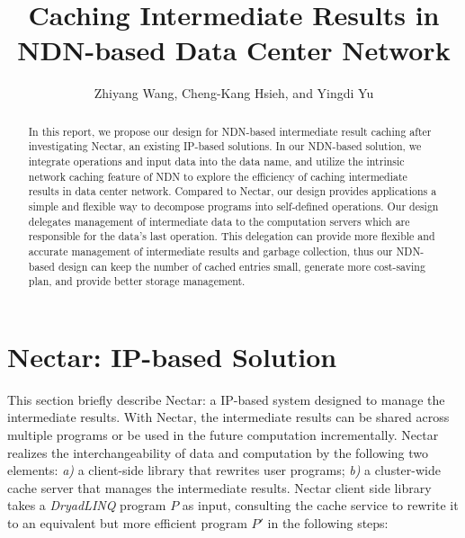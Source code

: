 \documentclass[journal]{IEEEtran}
\begin{document}
\title{Caching Intermediate Results in NDN-based Data Center Network}

\author{Zhiyang Wang,
  Cheng-Kang Hsieh,
  and Yingdi Yu}

\maketitle

\begin{abstract}
In this report, we propose our design for NDN-based intermediate result caching
after investigating Nectar, an existing IP-based solutions.  In our NDN-based
solution, we integrate operations and input data into the data name, and utilize
the intrinsic network caching feature of NDN to explore the efficiency of
caching intermediate results in data center network.  Compared to Nectar, our
design provides applications a simple and flexible way to decompose programs
into self-defined operations.  Our design delegates management of intermediate
data to the computation servers which are responsible for the data's last
operation.  This delegation can provide more flexible and accurate management of
intermediate results and garbage collection, thus our NDN-based design can keep
the number of cached entries small, generate more cost-saving plan, and provide
better storage management.
\end{abstract}

\section{Nectar: IP-based Solution}
This section
briefly describe Nectar: a IP-based system designed to manage the intermediate
results. With Nectar, the intermediate results can be shared across multiple
programs or be used in the future computation incrementally.  Nectar realizes
the interchangeability of data and computation by the following two elements:
\emph{a)} a client-side library that rewrites user programs; \emph{b)} a
cluster-wide cache server that manages the intermediate results.  Nectar client
side library takes a \emph{DryadLINQ} program $P$ as input, consulting the
cache service to rewrite it to an equivalent but more efficient program $P'$ in
the following steps:
\end{document}
